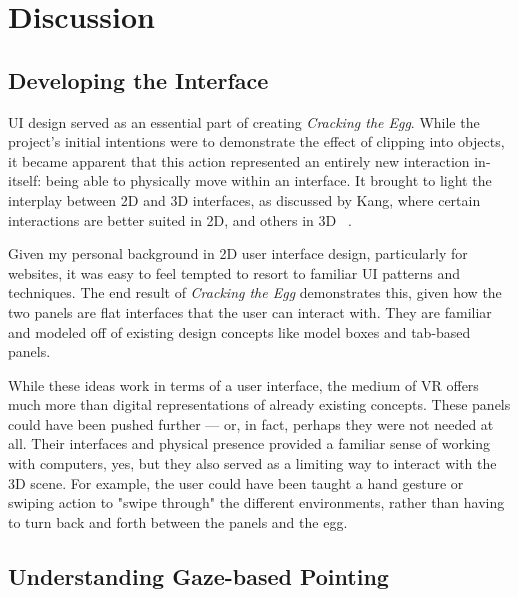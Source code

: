 \documentclass[10pt,twocolumn,letterpaper]{article}
\begin{document}

\section{Discussion}

\subsection{Developing the Interface}

UI design served as an essential part of creating \textit{Cracking the Egg}. While the project's initial intentions were to demonstrate the effect of clipping into objects, it became apparent that this action represented an entirely new interaction in-itself: being able to physically move within an interface. It brought to light the interplay between 2D and 3D interfaces, as discussed by Kang, where certain interactions are better suited in 2D, and others in 3D ~\cite{7892351}.

Given my personal background in 2D user interface design, particularly for websites, it was easy to feel tempted to resort to familiar UI patterns and techniques. The end result of \textit{Cracking the Egg} demonstrates this, given how the two panels are flat interfaces that the user can interact with. They are familiar and modeled off of existing design concepts like model boxes and tab-based panels.

While these ideas work in terms of a user interface, the medium of VR offers much more than digital representations of already existing concepts. These panels could have been pushed further — or, in fact, perhaps they were not needed at all. Their interfaces and physical presence provided a familiar sense of working with computers, yes, but they also served as a limiting way to interact with the 3D scene. For example, the user could have been taught a hand gesture or swiping action to "swipe through" the different environments, rather than having to turn back and forth between the panels and the egg.

\subsection{Understanding Gaze-based Pointing}
\end{document}
